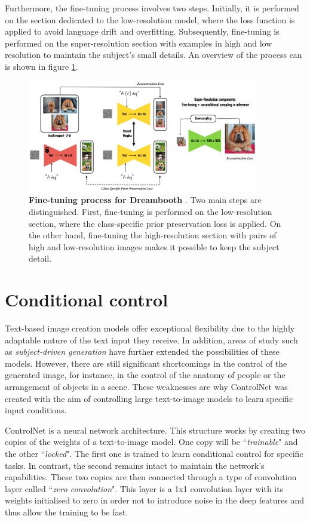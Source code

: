 Furthermore, the fine-tuning process involves two steps. Initially, it is performed on the section dedicated to the low-resolution model, where the loss function is applied to avoid language drift and overfitting. Subsequently, fine-tuning is performed on the super-resolution section with examples in high and low resolution to maintain the subject's small details. An overview of the process can is shown in figure \ref{fig:dreamboothS}.

\begin{figure}
    \centering
    \includegraphics[width=0.9\textwidth]{Pictures/dreamboothS.png} 
    \caption{\textbf{Fine-tuning process for Dreambooth} \cite{ruiz2023dreambooth}. Two main steps are distinguished. First, fine-tuning is performed on the low-resolution section, where the class-specific prior preservation loss is applied. On the other hand, fine-tuning the high-resolution section with pairs of high and low-resolution images makes it possible to keep the subject detail.}
    \label{fig:dreamboothS}
\end{figure}

\section{Conditional control}

Text-based image creation models offer exceptional flexibility due to the highly adaptable nature of the text input they receive. In addition, areas of study such as \textit{subject-driven generation} have further extended the possibilities of these models. However, there are still significant shortcomings in the control of the generated image, for instance, in the control of the anatomy of people or the arrangement of objects in a scene. These weaknesses are why ControlNet \cite{zhang2023adding} was created with the aim of controlling large text-to-image models to learn specific input conditions. 

ControlNet is a neural network architecture. This structure works by creating two copies of the weights of a text-to-image model. One copy will be ``\textit{trainable}" and the other ``\textit{locked}". The first one is trained to learn conditional control for specific tasks. In contrast, the second remains intact to maintain the network's capabilities. These two copies are then connected through a type of convolution layer called ``\textit{zero convolution}". This layer is a 1x1 convolution layer with its weights initialised to zero in order not to introduce noise in the deep features and thus allow the training to be fast. 

